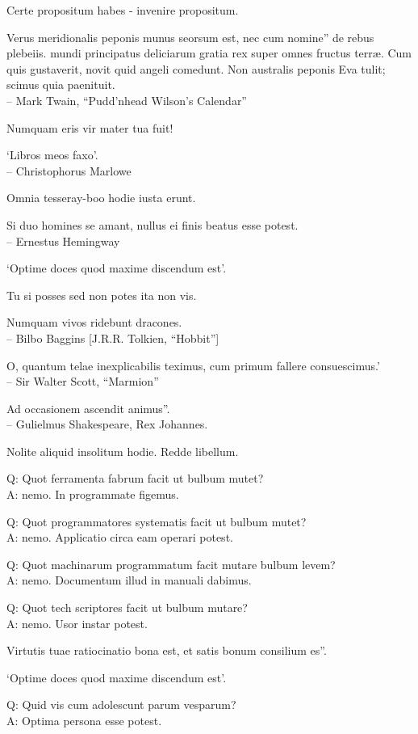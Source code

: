 \documentclass[titlepage,12pt]{memoir}
\begin{document}
Certe propositum habes - invenire propositum.

Verus meridionalis peponis munus seorsum est, nec cum nomine”
de rebus plebeiis. mundi principatus deliciarum gratia rex
super omnes fructus terræ. Cum quis gustaverit, novit quid
angeli comedunt. Non australis peponis Eva tulit; scimus quia
paenituit.
\\-- Mark Twain, “Pudd’nhead Wilson’s Calendar”

Numquam eris vir mater tua fuit!

‘Libros meos faxo’.
\\-- Christophorus Marlowe

Omnia tesseray-boo hodie iusta erunt.

Si duo homines se amant, nullus ei finis beatus esse potest.
\\-- Ernestus Hemingway

‘Optime doces quod maxime discendum est’.

Tu si posses sed non potes ita non vis.

Numquam vivos ridebunt dracones.
\\-- Bilbo Baggins [J.R.R. Tolkien, “Hobbit”]

O, quantum telae inexplicabilis teximus, cum primum fallere consuescimus.’
\\-- Sir Walter Scott, “Marmion”

Ad occasionem ascendit animus”.
\\-- Gulielmus Shakespeare, Rex Johannes.

Nolite aliquid insolitum hodie. Redde libellum.

Q: Quot ferramenta fabrum facit ut bulbum mutet?\\
A: nemo. In programmate figemus.

Q: Quot programmatores systematis facit ut bulbum mutet?\\
A: nemo. Applicatio circa eam operari potest.

Q: Quot machinarum programmatum facit mutare bulbum levem?\\
A: nemo. Documentum illud in manuali dabimus.

Q: Quot tech scriptores facit ut bulbum mutare?\\
A: nemo. Usor instar potest.

Virtutis tuae ratiocinatio bona est, et satis bonum consilium es”.

‘Optime doces quod maxime discendum est’.

Q: Quid vis cum adolescunt parum vesparum?\\
A: Optima persona esse potest.
\end{document}
